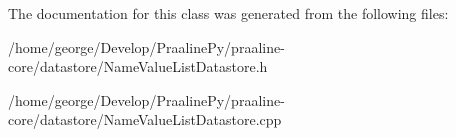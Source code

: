 The documentation for this class was generated from the following files\+:\begin{DoxyCompactItemize}
\item 
/home/george/\+Develop/\+Praaline\+Py/praaline-\/core/datastore/Name\+Value\+List\+Datastore.\+h\item 
/home/george/\+Develop/\+Praaline\+Py/praaline-\/core/datastore/Name\+Value\+List\+Datastore.\+cpp\end{DoxyCompactItemize}
